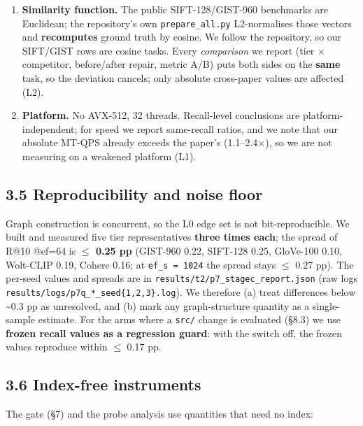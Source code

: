 \documentclass[
  10pt,
]{article}
\providecommand{\tightlist}{%
  \setlength{\itemsep}{0pt}\setlength{\parskip}{0pt}}
\begin{document}
\begin{enumerate}
\def\labelenumi{\arabic{enumi}.}
\tightlist
\item
  \textbf{Similarity function.} The public SIFT-128/GIST-960 benchmarks
  are Euclidean; the repository's own \texttt{prepare\_all.py}
  L2-normalises those vectors and \textbf{recomputes} ground truth by
  cosine. We follow the repository, so our SIFT/GIST rows are cosine
  tasks. Every \emph{comparison} we report (tier $\times$ competitor,
  before/after repair, metric A/B) puts both sides on the \textbf{same}
  task, so the deviation cancels; only absolute cross-paper values are
  affected (L2).
\item
  \textbf{Platform.} No AVX-512, 32 threads. Recall-level conclusions
  are platform-independent; for speed we report same-recall ratios, and
  we note that our absolute MT-QPS already exceeds the paper's
  (1.1--2.4$\times$), so we are not measuring on a weakened platform (L1).
\end{enumerate}

\subsection{3.5 Reproducibility and noise
floor}\label{reproducibility-and-noise-floor}

Graph construction is concurrent, so the L0 edge set is not
bit-reproducible. We built and measured five tier representatives
\textbf{three times each}; the spread of R@10 @ef=64 is \textbf{$\leq$ 0.25
pp} (GIST-960 0.22, SIFT-128 0.25, GloVe-100 0.10, Wolt-CLIP 0.19,
Cohere 0.16; at \texttt{ef\_s\ =\ 1024} the spread stays $\leq$ 0.27 pp). The
per-seed values and spreads are in
\texttt{results/t2/p7\_stagec\_report.json} (raw logs
\texttt{results/logs/p7q\_*\_seed\{1,2,3\}.log}). We therefore (a) treat
differences below \textasciitilde0.3 pp as unresolved, and (b) mark any
graph-structure quantity as a single-sample estimate. For the arms where
a \texttt{src/} change is evaluated (§8.3) we use \textbf{frozen recall
values as a regression guard}: with the switch off, the frozen values
reproduce within $\leq$ 0.17 pp.

\subsection{3.6 Index-free instruments}\label{index-free-instruments}

The gate (§7) and the probe analysis use quantities that need no index:
\end{document}

